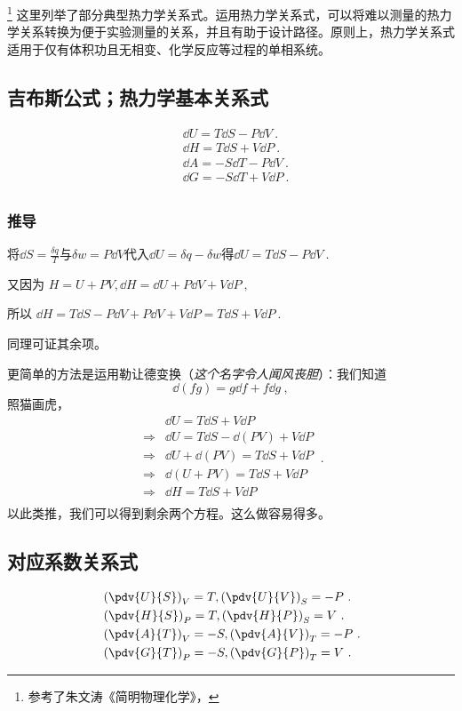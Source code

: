 
\footnote{参考了朱文涛《简明物理化学》，}
这里列举了部分典型热力学关系式。运用热力学关系式，可以将难以测量的热力学关系转换为便于实验测量的关系，并且有助于设计路径。原则上，热力学关系式适用于仅有体积功且无相变、化学反应等过程的单相系统。

\subsection{吉布斯公式；热力学基本关系式}
\begin{align}\label{eq_MWRel_4}
&\dd U = T \dd S - P \dd V~.\\
&\dd H = T \dd S + V \dd P~.\\
&\dd A = -S \dd T - P \dd V~.\\
&\dd G = -S \dd T +V \dd P~.\\
\end{align}

\subsubsection{推导}
将$\dd S = \frac{\delta q}{T}$与$\delta w = P\dd V$代入$\dd U=\delta q-\delta w$得$\dd U = T \dd S - P \dd V~.$

又因为 $H=U+PV, \dd H = \dd U + P \dd V + V \dd P~,$

所以 $\dd H = T \dd S - P \dd V+ P \dd V + V \dd P = T \dd S + V \dd P~.$

同理可证其余项。

更简单的方法是运用勒让德变换（\textsl{这个名字令人闻风丧胆}）：我们知道
$$\dd (fg) = g \dd f + f \dd g~,$$
照猫画虎，
$$
\begin{aligned}
& \dd U = T \dd S + V \dd P \\
\Rightarrow
&\dd U = T \dd S - \dd (PV) + V \dd P \\
\Rightarrow
&\dd U + \dd (PV) =  T \dd S+ V \dd P\\
\Rightarrow
&\dd (U+PV) =  T \dd S + V \dd P\\
\Rightarrow
&\dd H = T \dd S + V \dd P\\
\end{aligned}
~.
$$
以此类推，我们可以得到剩余两个方程。这么做容易得多。

\subsection{对应系数关系式}
\begin{align}
&\left(\pdv{U}{S}\right)_V=T, \left(\pdv{U}{V}\right)_S=-P~.
\\
&\left(\pdv{H}{S}\right)_P=T, \left(\pdv{H}{P}\right)_S=V~.
\\
&\left(\pdv{A}{T}\right)_V=-S, \left(\pdv{A}{V}\right)_T=-P~.
\\
&\left(\pdv{G}{T}\right)_P=-S, \left(\pdv{G}{P}\right)_T=V~.
\end{align}

